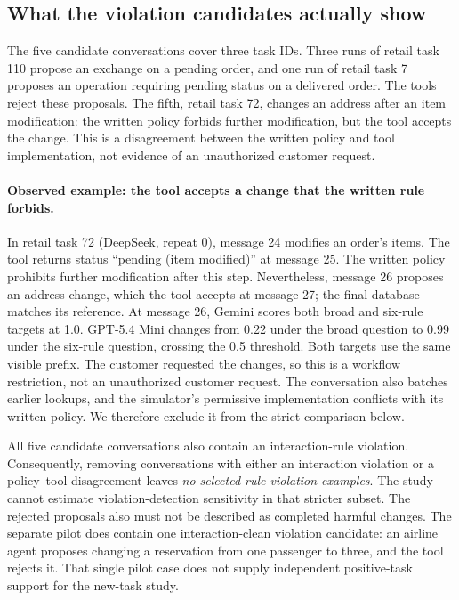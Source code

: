 \subsection{What the violation candidates actually show}
The five candidate conversations cover three task IDs. Three runs of retail task 110 propose an exchange on a pending order, and one run of retail task 7 proposes an operation requiring pending status on a delivered order. The tools reject these proposals. The fifth, retail task 72, changes an address after an item modification: the written policy forbids further modification, but the tool accepts the change. This is a disagreement between the written policy and tool implementation, not evidence of an unauthorized customer request.

\paragraph{Observed example: the tool accepts a change that the written rule forbids.}
In retail task 72 (DeepSeek, repeat 0), message 24 modifies an order's items. The tool returns status ``pending (item modified)'' at message 25. The written policy prohibits further modification after this step. Nevertheless, message 26 proposes an address change, which the tool accepts at message 27; the final database matches its reference. At message 26, Gemini scores both broad and six-rule targets at 1.0. GPT-5.4 Mini changes from 0.22 under the broad question to 0.99 under the six-rule question, crossing the 0.5 threshold. Both targets use the same visible prefix. The customer requested the changes, so this is a workflow restriction, not an unauthorized customer request. The conversation also batches earlier lookups, and the simulator's permissive implementation conflicts with its written policy. We therefore exclude it from the strict comparison below.

All five candidate conversations also contain an interaction-rule violation. Consequently, removing conversations with either an interaction violation or a policy--tool disagreement leaves \emph{no selected-rule violation examples}. The study cannot estimate violation-detection sensitivity in that stricter subset. The rejected proposals also must not be described as completed harmful changes. The separate pilot does contain one interaction-clean violation candidate: an airline agent proposes changing a reservation from one passenger to three, and the tool rejects it. That single pilot case does not supply independent positive-task support for the new-task study.

